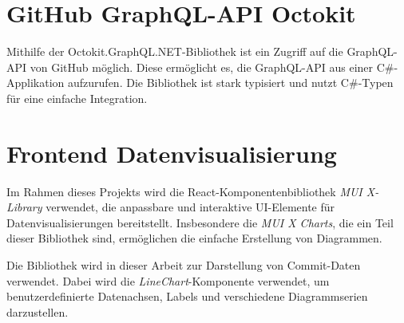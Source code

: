 \section{GitHub GraphQL-API Octokit}
Mithilfe der Octokit.GraphQL.NET-Bibliothek ist ein Zugriff auf die GraphQL-API von GitHub möglich. Diese ermöglicht es, die GraphQL-API aus einer C\#-Applikation aufzurufen. Die Bibliothek ist stark typisiert und nutzt C\#-Typen für eine einfache Integration.
\parencite{noauthor_octokitoctokitgraphqlnet_2025}


\section{Frontend Datenvisualisierung}
Im Rahmen dieses Projekts wird die React-Komponentenbibliothek \textit{MUI X-Library} verwendet, die anpassbare und interaktive UI-Elemente für Datenvisualisierungen bereitstellt. Insbesondere die \textit{MUI X Charts}, die ein Teil dieser Bibliothek sind, ermöglichen die einfache Erstellung von Diagrammen.

Die Bibliothek wird in dieser Arbeit zur Darstellung von Commit-Daten verwendet. Dabei wird die \textit{LineChart}-Komponente verwendet, um benutzerdefinierte Datenachsen, Labels und verschiedene Diagrammserien darzustellen. \parencite{noauthor_react_nodate}

